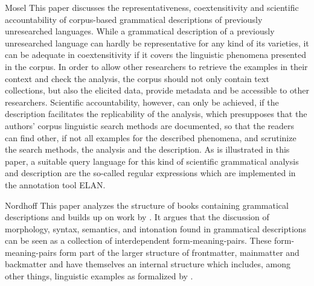 Mosel
This paper discusses the representativeness, coextensitivity and scientific accountability of corpus-based grammatical descriptions of previously unresearched languages. While a grammatical description of a previously unresearched language can hardly be representative for any kind of its varieties, it can be adequate in coextensitivity if it covers the linguistic phenomena presented in the corpus. In order to allow other researchers to retrieve the examples in their context and check the analysis, the corpus should not only contain text collections, but also the elicited data, provide metadata and be accessible to other researchers. Scientific accountability, however, can only be achieved, if the description facilitates the replicability of the analysis, which presupposes that the authors’ corpus linguistic search methods are documented, so that the readers can find other, if not all examples for the described phenomena, and scrutinize the search methods, the analysis and the description. As is illustrated in this paper, a suitable query language for this kind of scientific grammatical analysis and description are the so-called regular expressions which are implemented in the annotation tool ELAN.

Nordhoff
This paper analyzes the structure of books containing grammatical descriptions and builds up on work by \citet{Good2004}. It argues that the discussion of morphology, syntax, semantics, and intonation found in grammatical descriptions can be seen as a collection of interdependent form-meaning-pairs. These form-meaning-pairs form part of the larger structure of frontmatter, mainmatter and backmatter \citep{Mosel2006craft} and have themselves an internal structure which includes, among other things, linguistic examples as formalized by \citet{BowEtAl2003}.


